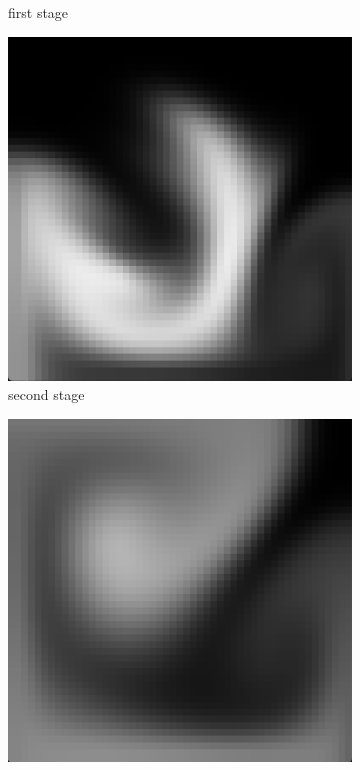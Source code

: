 \begin{figure}[h]
\begin{subfigure}[b]{0.2\textwidth}
        \caption{first stage}
    \end{subfigure}
    \hspace{1em}
    \begin{subfigure}[b]{0.2\textwidth}
        \includegraphics[width=\textwidth]{figures/grid50_2.png}
        \caption{second stage}
    \end{subfigure}
    \hspace{1em}
    \begin{subfigure}[b]{0.2\textwidth}
        \includegraphics[width=\textwidth]{figures/grid50_3.png}

\end{subfigure}
\end{figure}

